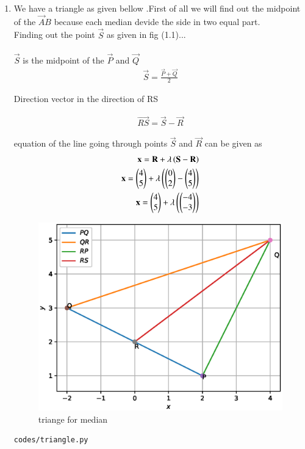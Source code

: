 \renewcommand{\theequation}{\theenumi}
\begin{enumerate}[label=\arabic*.,ref=\thesubsection.\theenumi]
\item We have a triangle as given bellow .First of all we will find out the midpoint of the $\vec AB$ because each median devide the side in two equal part.
\\
 Finding out the point $\vec S $ as given in fig (1.1)...
\\
\\
$\vec S$ is the midpoint of the $\vec P$ and $\vec Q$
\\
\begin{align}
	\vec S = \frac{\vec P + \vec Q}{2}
\end{align}

Direction vector in the direction of RS

\begin{align}
	\vec {RS}= \vec S - \vec R
\end{align}

  equation of the line going through points $\vec S$ and $\vec R$ can be given as 
\begin{align}
	\mathbf x = \mathbf R + \lambda \left(\mathbf S - \mathbf R\right)
	\\
	\mathbf x = \begin{pmatrix}4\\5\end{pmatrix} + \lambda \left(\begin{pmatrix}0\\2\end{pmatrix} - \begin{pmatrix}4\\5\end{pmatrix}\right)
	\\
	\mathbf x = \begin{pmatrix}4\\5\end{pmatrix} + \lambda \left(\begin{pmatrix}-4\\-3\end{pmatrix}\right)
\end{align}
\begin{figure}[!ht]
	\centering
	\includegraphics[width=\columnwidth]{./figures/triangle.eps}
	\caption{triange for median }
	\label{fig:angle_py}
\end{figure}
\begin{lstlisting}
codes/triangle.py
\end{lstlisting}
\end{enumerate}